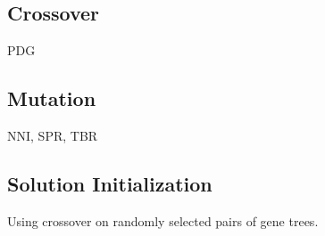 \subsection{Crossover}
PDG
\subsection{Mutation}
NNI, SPR, TBR
\subsection{Solution Initialization}
Using crossover on randomly selected pairs of gene trees.